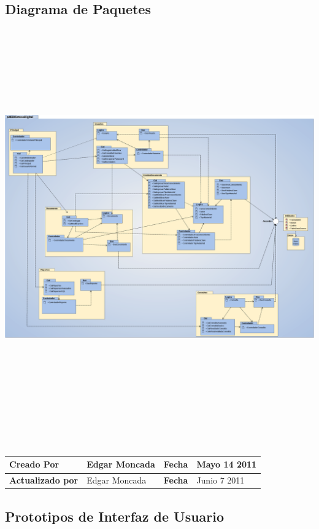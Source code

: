 \subsection{Diagrama de Paquetes}
	\begin{minipage}[c]{1\linewidth}
	    \centering
        \includegraphics[width=19.5cm, height=17cm, angle=90]{diagramaPaquetes}
    \end{minipage}\\[.3cm]
       	
    \begin{tabular}{|p{3.5cm}|p{4.5cm}|p{2.5cm}|p{4.5cm}|}\hline
	{\bf Creado Por} & {Edgar Moncada} & {\bf Fecha} & {Mayo 14 2011}\\
	\hline
	{\bf Actualizado por} & {Edgar Moncada} & {\bf Fecha} & {Junio 7 2011}\\
	\hline
	\end{tabular}
	
\subsection{Prototipos de Interfaz de Usuario}


